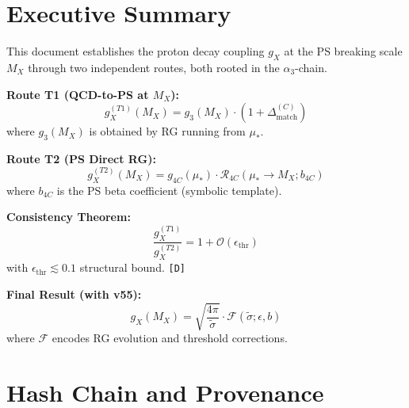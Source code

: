 \documentclass[11pt,a4paper]{article}
\newcommand{\tagD}{\textcolor{green!50!black}{\texttt{[D]}}}
\theoremstyle{definition}
\begin{document}
\tableofcontents
\newpage

\section{Executive Summary}
\label{sec:executive}


\begin{canonbox}
This document establishes the proton decay coupling $g_X$ at the PS breaking
scale $M_X$ through two independent routes, both rooted in the $\alpha_3$-chain.

\textbf{Route T1 (QCD-to-PS at $M_X$):}
\begin{equation}
\label{eq:gx-route-t1-summary}
\boxed{g_X^{(T1)}(M_X) = g_3(M_X) \cdot \left(1 + \Delta_{\text{match}}^{(C)}\right)}
\end{equation}
where $g_3(M_X)$ is obtained by RG running from $\mu_*$.

\textbf{Route T2 (PS Direct RG):}
\begin{equation}
\label{eq:gx-route-t2-summary}
\boxed{g_X^{(T2)}(M_X) = g_{4C}(\mu_*) \cdot \mathcal{R}_{4C}(\mu_* \to M_X; b_{4C})}
\end{equation}
where $b_{4C}$ is the PS beta coefficient (symbolic template).

\textbf{Consistency Theorem:}
\begin{equation}
\label{eq:two-route-consistency-summary}
\frac{g_X^{(T1)}}{g_X^{(T2)}} = 1 + \mathcal{O}(\epsilon_{\text{thr}})
\end{equation}
with $\epsilon_{\text{thr}} \lesssim 0.1$ structural bound. \tagD{}

\textbf{Final Result (with v55):}
\begin{equation}
\label{eq:gx-final-summary}
\boxed{g_X(M_X) = \sqrt{\frac{4\pi}{\tilde{\sigma}}} \cdot \mathcal{F}(\tilde{\sigma}; \epsilon, b)}
\end{equation}
where $\mathcal{F}$ encodes RG evolution and threshold corrections.
\end{canonbox}

\section{Hash Chain and Provenance}
\label{sec:hashchain}
\end{document}
